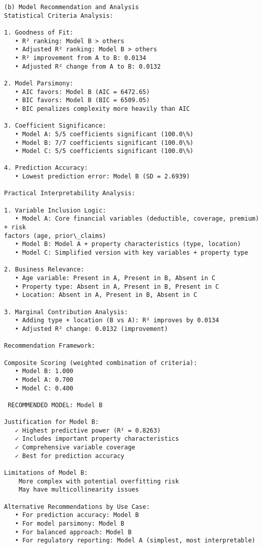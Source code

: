 \documentclass[8pt, twocolumn]{extarticle}
\begin{document}
    \begin{Verbatim}[commandchars=\\\{\}]
(b) Model Recommendation and Analysis
Statistical Criteria Analysis:

1. Goodness of Fit:
   • R² ranking: Model B > others
   • Adjusted R² ranking: Model B > others
   • R² improvement from A to B: 0.0134
   • Adjusted R² change from A to B: 0.0132

2. Model Parsimony:
   • AIC favors: Model B (AIC = 6472.65)
   • BIC favors: Model B (BIC = 6509.05)
   • BIC penalizes complexity more heavily than AIC

3. Coefficient Significance:
   • Model A: 5/5 coefficients significant (100.0\%)
   • Model B: 7/7 coefficients significant (100.0\%)
   • Model C: 5/5 coefficients significant (100.0\%)

4. Prediction Accuracy:
   • Lowest prediction error: Model B (SD = 2.6939)

Practical Interpretability Analysis:

1. Variable Inclusion Logic:
   • Model A: Core financial variables (deductible, coverage, premium) + risk
factors (age, prior\_claims)
   • Model B: Model A + property characteristics (type, location)
   • Model C: Simplified version with key variables + property type

2. Business Relevance:
   • Age variable: Present in A, Present in B, Absent in C
   • Property type: Absent in A, Present in B, Present in C
   • Location: Absent in A, Present in B, Absent in C

3. Marginal Contribution Analysis:
   • Adding type + location (B vs A): R² improves by 0.0134
   • Adjusted R² change: 0.0132 (improvement)

Recommendation Framework:

Composite Scoring (weighted combination of criteria):
   • Model B: 1.000
   • Model A: 0.700
   • Model C: 0.400

 RECOMMENDED MODEL: Model B

Justification for Model B:
   ✓ Highest predictive power (R² = 0.8263)
   ✓ Includes important property characteristics
   ✓ Comprehensive variable coverage
   ✓ Best for prediction accuracy

Limitations of Model B:
    More complex with potential overfitting risk
    May have multicollinearity issues

Alternative Recommendations by Use Case:
   • For prediction accuracy: Model B
   • For model parsimony: Model B
   • For balanced approach: Model B
   • For regulatory reporting: Model A (simplest, most interpretable)
    \end{Verbatim}
\end{document}

